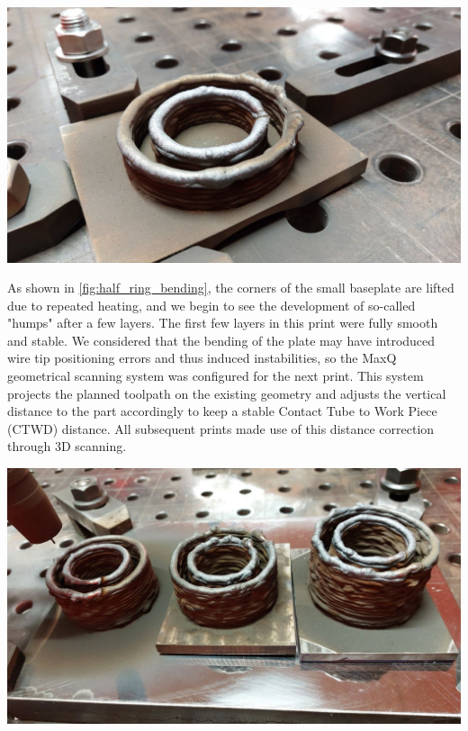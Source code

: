 \begin{minipage}{\linewidth}
    \centering
    \includegraphics[width=\linewidth]{images/photo_2023-11-14_15-40-54.jpg}
    \label{fig:half_ring_bending}
\end{minipage}

As shown in \autoref{fig:half_ring_bending}, the corners of the small baseplate are lifted due to repeated heating, and we begin to see the development of so-called "humps" after a few layers. The first few layers in this print were fully smooth and stable. We considered that the bending of the plate may have introduced wire tip positioning errors and thus induced instabilities, so the MaxQ geometrical scanning system was configured for the next print. This system projects the planned toolpath on the existing geometry and adjusts the vertical distance to the part accordingly to keep a stable Contact Tube to Work Piece (CTWD) distance. All subsequent prints made use of this distance correction through 3D scanning. 

\begin{minipage}{\linewidth}
    \centering
    \includegraphics[width=\linewidth]{images/photo_2023-11-14_15-39-49.jpg}
    \label{fig:3_rings}
\end{minipage}

